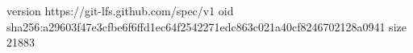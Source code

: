 version https://git-lfs.github.com/spec/v1
oid sha256:a29603f47e3cfbe6f6ffd1ec64f2542271edc863c021a40cf8246702128a0941
size 21883
